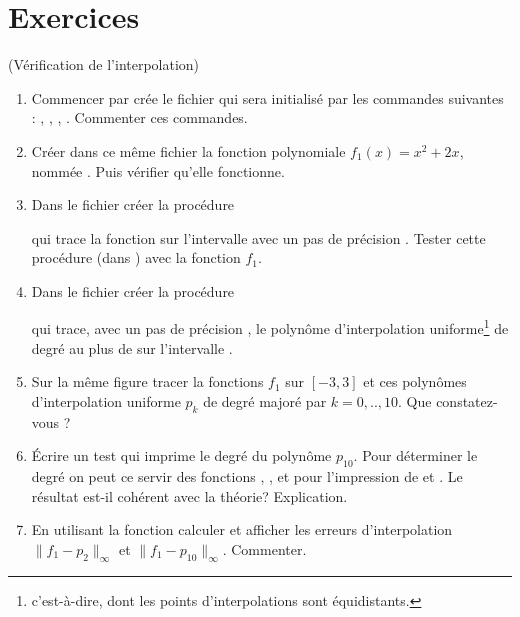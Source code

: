 \documentclass[a4paper,12pt,reqno]{amsart}
\begin{document}
\section{Exercices}

\begin{exo} (Vérification de l'interpolation)

  \begin{enumerate}
    \item Commencer par crée le fichier  qui sera initialisé par les commandes suivantes : , , , . Commenter ces commandes.

    \item Créer dans ce même fichier la fonction polynomiale $f_{1}(x)=x^{2}+2x$, nommée . Puis vérifier qu'elle fonctionne.

    \item Dans le fichier  créer la procédure
    \begin{center}
    \end{center}
    qui trace la fonction  sur l'intervalle \sclb{[-a,a]} avec un pas de précision . Tester cette procédure (dans ) avec la fonction $f_{1}$.

    \item Dans le fichier  créer la procédure
    \begin{center}
    \end{center}
    qui trace, avec un pas de précision , le polynôme d'interpolation uniforme\footnote{c'est-à-dire, dont les points d'interpolations sont équidistants.} de degré au plus  de  sur l'intervalle \sclb{[-a,a]}.

    \item Sur la même figure tracer la fonctions $f_{1}$ sur $[-3,3]$ et ces polynômes d'interpolation uniforme $p_{k}$ de degré majoré par $k=0,..,10$. Que constatez-vous ?

    \item Écrire un test qui imprime le degré du polynôme $p_{10}$. Pour déterminer le degré on peut ce servir des fonctions , , et pour l'impression de  et .\newline
    Le résultat est-il cohérent avec la théorie? Explication.

    \item En utilisant la fonction  calculer et afficher les erreurs d'interpolation $\|f_{1}-p_{2}\|_{\infty}$ et $\|f_{1}-p_{10}\|_{\infty}$. Commenter.

  \end{enumerate}
\end{exo}
\end{document}
